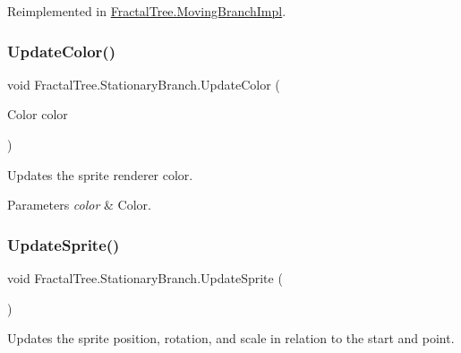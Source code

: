 Reimplemented in \hyperlink{class_fractal_tree_1_1_moving_branch_impl_a4e7cde65899abaf121a906d06874c330}{Fractal\+Tree.\+Moving\+Branch\+Impl}.

\mbox{\label{class_fractal_tree_1_1_stationary_branch_ae80389d3859645e0023dd11533b06e83}} 
\subsubsection{\texorpdfstring{Update\+Color()}{UpdateColor()}}
{\footnotesize\ttfamily void Fractal\+Tree.\+Stationary\+Branch.\+Update\+Color (\begin{DoxyParamCaption}\item[{Color}]{color }\end{DoxyParamCaption})\hspace{0.3cm}{\ttfamily [protected]}}



Updates the sprite renderer color. 


\begin{DoxyParams}{Parameters}
{\em color} & Color.\\
\hline
\end{DoxyParams}
\mbox{\label{class_fractal_tree_1_1_stationary_branch_a79b077e778c1d8aa92f3f4ad9a516058}} 
\subsubsection{\texorpdfstring{Update\+Sprite()}{UpdateSprite()}}
{\footnotesize\ttfamily void Fractal\+Tree.\+Stationary\+Branch.\+Update\+Sprite (\begin{DoxyParamCaption}{ }\end{DoxyParamCaption})\hspace{0.3cm}{\ttfamily [protected]}}



Updates the sprite position, rotation, and scale in relation to the start and point. 



